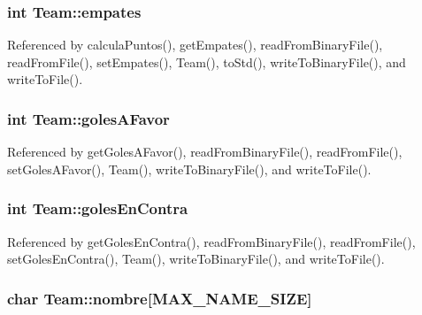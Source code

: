 \hypertarget{class_team_af9d642c2765645b9886ce332b0d9f2c8}{}
\subsubsection[{empates}]{\setlength{\rightskip}{0pt plus 5cm}int Team\+::empates\hspace{0.3cm}{\ttfamily [private]}}\label{class_team_af9d642c2765645b9886ce332b0d9f2c8}


Referenced by calcula\+Puntos(), get\+Empates(), read\+From\+Binary\+File(), read\+From\+File(), set\+Empates(), Team(), to\+Std(), write\+To\+Binary\+File(), and write\+To\+File().

\hypertarget{class_team_af84c67ce79cc5a92285739baa6b93e8b}{}
\subsubsection[{goles\+A\+Favor}]{\setlength{\rightskip}{0pt plus 5cm}int Team\+::goles\+A\+Favor\hspace{0.3cm}{\ttfamily [private]}}\label{class_team_af84c67ce79cc5a92285739baa6b93e8b}


Referenced by get\+Goles\+A\+Favor(), read\+From\+Binary\+File(), read\+From\+File(), set\+Goles\+A\+Favor(), Team(), write\+To\+Binary\+File(), and write\+To\+File().

\hypertarget{class_team_aa1afdfb306f4207e4cbd79fb56facfbf}{}
\subsubsection[{goles\+En\+Contra}]{\setlength{\rightskip}{0pt plus 5cm}int Team\+::goles\+En\+Contra\hspace{0.3cm}{\ttfamily [private]}}\label{class_team_aa1afdfb306f4207e4cbd79fb56facfbf}


Referenced by get\+Goles\+En\+Contra(), read\+From\+Binary\+File(), read\+From\+File(), set\+Goles\+En\+Contra(), Team(), write\+To\+Binary\+File(), and write\+To\+File().

\hypertarget{class_team_a8d210ec74ccdfe830c485eddc6ac76db}{}
\subsubsection[{nombre}]{\setlength{\rightskip}{0pt plus 5cm}char Team\+::nombre\mbox{[}{\bf M\+A\+X\+\_\+\+N\+A\+M\+E\+\_\+\+S\+I\+Z\+E}\mbox{]}\hspace{0.3cm}{\ttfamily [private]}}\label{class_team_a8d210ec74ccdfe830c485eddc6ac76db}


